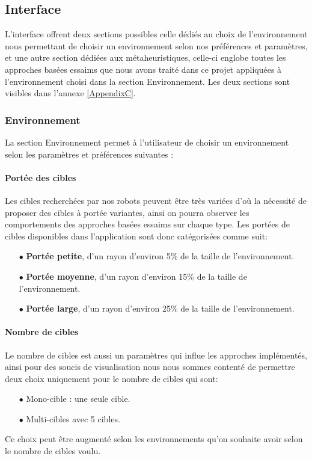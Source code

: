 \subsection{Interface}
L'interface offrent deux sections possibles celle dédiés au choix de l'environnement nous permettant de choisir un environnement selon nos préférences et paramètres, et une autre section dédiées aux métaheuristiques, celle-ci englobe toutes les approches basées essaims que nous avons traité dans ce projet appliquées à l'environnement choisi dans la section Environnement.
Les deux sections sont visibles dans l'annexe \ref{AppendixC}.

\subsubsection{Environnement}
La section Environnement permet à l'utilisateur de choisir un environnement selon les paramètres et préférences suivantes :

\paragraph{Portée des cibles}
Les cibles recherchées par nos robots peuvent être très variées d'où la nécessité de proposer des cibles à portée variantes, ainsi on pourra observer les comportements des approches basées essaims sur chaque type. Les portées de cibles disponibles dans l'application sont donc catégorisées comme suit:
\vspace{0.3cm}
\begin{itemize}
	\item [$\bullet$] \textbf{Portée petite}, d'un rayon d'environ 5\% de la taille de l'environnement.
	\item [$\bullet$] \textbf{Portée moyenne}, d'un rayon d'environ 15\% de la taille de l'environnement.
	\item [$\bullet$] \textbf{Portée large}, d'un rayon d'environ 25\% de la taille de l'environnement.
\end{itemize}


\paragraph{Nombre de cibles}
Le nombre de cibles est aussi un paramètres qui influe les approches implémentés, ainsi pour des soucis de visualisation nous nous sommes contenté de permettre deux choix uniquement pour le nombre de cibles qui sont:
\begin{itemize}
	\item [$\bullet$] Mono-cible : une seule cible.
	\item [$\bullet$] Multi-cibles avec 5 cibles.
\end{itemize}
Ce choix peut être augmenté selon les environnements qu'on souhaite avoir selon le nombre de cibles voulu.

